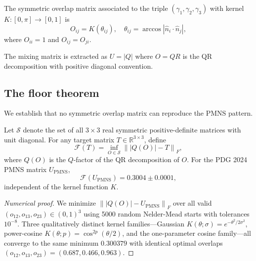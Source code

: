 \documentclass[epjc3]{svjour3}
\newcommand{\frob}[1]{\left\|#1\right\|_F}
\newcommand{\abs}[1]{\left|#1\right|}
\begin{document}
\begin{definition}
The symmetric overlap matrix associated to the triple $(\gamma_1,\gamma_2,\gamma_3)$
with kernel $K: [0,\pi] \to [0,1]$ is
\begin{equation}
  O_{ij} = K\!\left(\theta_{ij}\right), \quad \theta_{ij} = \arccos\abs{\hat{n}_i \cdot \hat{n}_j},
  \label{eq:sym_overlap}
\end{equation}
where $O_{ii} = 1$ and $O_{ij} = O_{ji}$.
\end{definition}

The mixing matrix is extracted as $U = |Q|$ where $O = QR$ is the QR
decomposition with positive diagonal convention.

\subsection{The floor theorem}

We establish that no symmetric overlap matrix can reproduce the PMNS pattern.

\begin{proposition}
\label{prop:floor}
Let $\mathcal{S}$ denote the set of all $3\times 3$ real symmetric
positive-definite matrices with unit diagonal. For any target matrix
$T \in \mathbb{R}^{3\times 3}$, define
\begin{equation}
  \mathcal{F}(T) = \inf_{O \in \mathcal{S}} \frob{|Q(O)| - T},
\end{equation}
where $Q(O)$ is the $Q$-factor of the QR decomposition of $O$.
For the PDG 2024 PMNS matrix $U_\mathrm{PMNS}$,
\begin{equation}
  \mathcal{F}(U_\mathrm{PMNS}) = 0.3004 \pm 0.0001,
\end{equation}
independent of the kernel function $K$.
\end{proposition}

\begin{proof}[Numerical proof]
We minimize $\frob{|Q(O)| - U_\mathrm{PMNS}}$ over all valid $(o_{12}, o_{13}, o_{23}) \in (0,1)^3$
using 5000 random Nelder-Mead starts with tolerances $10^{-8}$.
Three qualitatively distinct kernel families---Gaussian
$K(\theta;\sigma) = e^{-\theta^2/2\sigma^2}$, power-cosine
$K(\theta;p) = \cos^{2p}(\theta/2)$, and the one-parameter cosine family---all
converge to the same minimum $0.300379$ with identical optimal overlaps
$(o_{12}, o_{13}, o_{23}) = (0.687, 0.466, 0.963)$.
\end{proof}
\end{document}
